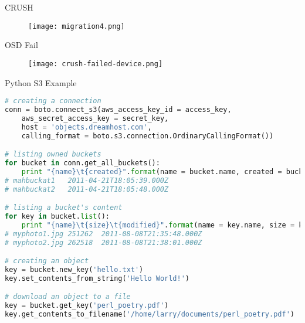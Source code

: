 \begin{frame}{CRUSH}
    \begin{figure}[htpb]
        \centering
        \texttt{[image: migration4.png]}
    \end{figure}
\end{frame}

\begin{frame}{OSD Fail}
    \begin{figure}[htpb]
        \centering
        \texttt{[image: crush-failed-device.png]}
    \end{figure}
\end{frame}

%

\begin{frame}[fragile]{Python S3 Example}
\begin{lstlisting}[language=python]
# creating a connection
conn = boto.connect_s3(aws_access_key_id = access_key,
    aws_secret_access_key = secret_key,
    host = 'objects.dreamhost.com',
    calling_format = boto.s3.connection.OrdinaryCallingFormat())

# listing owned buckets
for bucket in conn.get_all_buckets():
    print "{name}\t{created}".format(name = bucket.name, created = bucket.creation_date)
# mahbuckat1   2011-04-21T18:05:39.000Z
# mahbuckat2   2011-04-21T18:05:48.000Z

# listing a bucket's content
for key in bucket.list():
    print "{name}\t{size}\t{modified}".format(name = key.name, size = key.size, modified = key.last_modified)
# myphoto1.jpg 251262  2011-08-08T21:35:48.000Z
# myphoto2.jpg 262518  2011-08-08T21:38:01.000Z

# creating an object
key = bucket.new_key('hello.txt')
key.set_contents_from_string('Hello World!')

# download an object to a file
key = bucket.get_key('perl_poetry.pdf')
key.get_contents_to_filename('/home/larry/documents/perl_poetry.pdf')

\end{lstlisting}
\end{frame}
